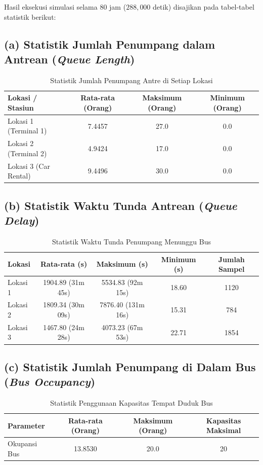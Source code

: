 \documentclass[11pt,a4paper]{article}
\begin{document}
Hasil eksekusi simulasi selama 80 jam ($288,000$ detik) disajikan pada tabel-tabel statistik berikut:

\subsection*{(a) Statistik Jumlah Penumpang dalam Antrean (\textit{Queue Length})}
\begin{table}[H]
\centering
\begin{tabular}{lccc}
\toprule
\textbf{Lokasi / Stasiun} & \textbf{Rata-rata (Orang)} & \textbf{Maksimum (Orang)} & \textbf{Minimum (Orang)} \\
\midrule
Lokasi 1 (Terminal 1) & 7.4457 & 27.0 & 0.0 \\
Lokasi 2 (Terminal 2) & 4.9424 & 17.0 & 0.0 \\
Lokasi 3 (Car Rental) & 9.4496 & 30.0 & 0.0 \\
\bottomrule
\end{tabular}
\caption{Statistik Jumlah Penumpang Antre di Setiap Lokasi}
\end{table}

\subsection*{(b) Statistik Waktu Tunda Antrean (\textit{Queue Delay})}
\begin{table}[H]
\centering
\begin{tabular}{lcccc}
\toprule
\textbf{Lokasi} & \textbf{Rata-rata (s)} & \textbf{Maksimum (s)} & \textbf{Minimum (s)} & \textbf{Jumlah Sampel} \\
\midrule
Lokasi 1 & 1904.89 (31m 45s) & 5534.83 (92m 15s) & 18.60 & 1120 \\
Lokasi 2 & 1809.34 (30m 09s) & 7876.40 (131m 16s) & 15.31 & 784 \\
Lokasi 3 & 1467.80 (24m 28s) & 4073.23 (67m 53s) & 22.71 & 1854 \\
\bottomrule
\end{tabular}
\caption{Statistik Waktu Tunda Penumpang Menunggu Bus}
\end{table}

\subsection*{(c) Statistik Jumlah Penumpang di Dalam Bus (\textit{Bus Occupancy})}
\begin{table}[H]
\centering
\begin{tabular}{lccc}
\toprule
\textbf{Parameter} & \textbf{Rata-rata (Orang)} & \textbf{Maksimum (Orang)} & \textbf{Kapasitas Maksimal} \\
\midrule
Okupansi Bus & 13.8530 & 20.0 & 20 \\
\bottomrule
\end{tabular}
\caption{Statistik Penggunaan Kapasitas Tempat Duduk Bus}
\end{table}
\end{document}
